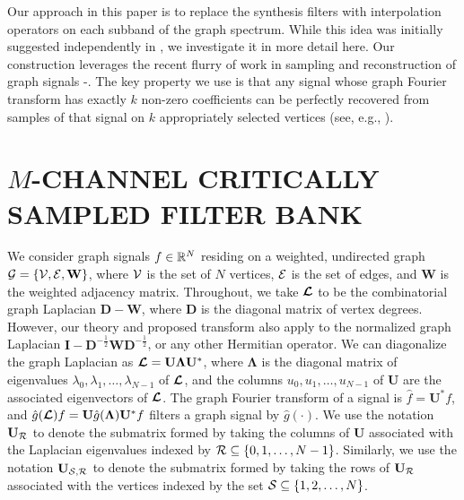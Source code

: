 \documentclass{article}
\begin{document}
Our approach in this paper is to replace the synthesis filters with interpolation operators on each subband of the graph spectrum. While this idea was initially suggested independently in \cite{chen2015discrete}, we investigate it in more detail here. Our construction leverages the recent flurry of work in sampling and reconstruction of graph signals \cite{chen2015discrete}-\nocite{pesenson_paley,narang2013interpolation,anis2014towards,gadde2015probabilistic,shomorony,PuyTGV15,chen2015signal,tsitsvero2016uncertainty}\cite{anis2016efficient}. The key property we use is that any signal whose graph Fourier transform has exactly $k$ non-zero coefficients can be perfectly recovered from samples of that signal on $k$ appropriately selected vertices (see, e.g., \cite[Theorem 1]{chen2015discrete} \cite[Proposition 1]{anis2016efficient}).


\section{$M$-CHANNEL CRITICALLY SAMPLED FILTER BANK}
We consider graph signals $f \in \mathbb{R}^N$ residing on a weighted, undirected graph ${\mathcal{G}}=\{{\mathcal{V}},{\mathcal{E}},\mathbf{W}\}$, where ${\mathcal{V}}$ is the set of $N$ vertices, ${\mathcal{E}}$ is the set of edges, and $\mathbf{W}$ is the weighted adjacency matrix. 
Throughout, we take $\boldsymbol{\mathcal{L}}$ to be the combinatorial graph Laplacian $\mathbf{D}-\mathbf{W}$, where $\mathbf{D}$ is the diagonal matrix of vertex degrees. However, our theory and proposed transform also apply to the normalized graph Laplacian $\mathbf{I}-\mathbf{D}^{-\frac{1}{2}}\mathbf{W}\mathbf{D}^{-\frac{1}{2}}$, or any other Hermitian operator. We can diagonalize the graph Laplacian as $\boldsymbol{\mathcal{L}}=\mathbf{U}{\boldsymbol \Lambda}\mathbf{U}^{*}$, where ${\boldsymbol \Lambda}$ is the diagonal matrix of eigenvalues $\lambda_0,\lambda_1,\ldots,\lambda_{N-1}$ of $\boldsymbol{\mathcal{L}}$, and the columns $u_0,u_1,\ldots,u_{N-1}$ of $\mathbf{U}$ are the associated eigenvectors of $\boldsymbol{\mathcal{L}}$. The graph Fourier transform of a signal is $\hat{f}=\mathbf{U}^{*}f$, and $\hat{g}(\boldsymbol{\mathcal{L}})f=\mathbf{U}\hat{g}({\boldsymbol \Lambda})\mathbf{U}^{*}f$ filters a graph signal by $\hat{g}(\cdot)$. We use the notation $\mathbf{U}_{{\cal R}}$ to denote the submatrix formed by taking the columns of $\mathbf{U}$ associated with the Laplacian eigenvalues indexed by ${\cal R} \subseteq \{0,1,\ldots,N-1\}$. Similarly, we use the notation $\mathbf{U}_{{\cal S},{\cal R}}$ to denote the submatrix  formed by taking the rows of $\mathbf{U}_{{\cal R}}$ associated with the vertices indexed by the set ${\cal S} \subseteq \{1,2,\ldots,N\}$.
\end{document}
